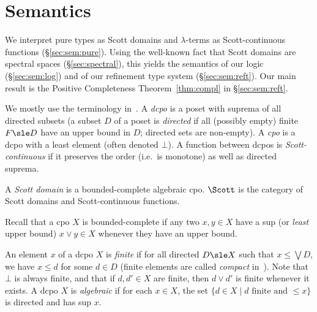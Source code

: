 \section{Semantics}
\label{sec:sem}

We interpret pure types as Scott domains and $\lambda$-terms as Scott-continuous
functions (\S\ref{sec:sem:pure}).
Using the well-known fact that Scott domains are spectral spaces
(\S\ref{sec:spectral}),
this yields the semantics of our logic (\S\ref{sec:sem:log})
and of our refinement type system (\S\ref{sec:sem:reft}).
Our main result is the Positive Completeness Theorem~\ref{thm:compl}
in \S\ref{sec:sem:reft}.


We mostly use the terminology in~\cite[\S 1]{ac98book}.
A \emph{dcpo} is a poset with suprema of all directed subsets
(a subset $D$ of a poset is \emph{directed} if all (possibly empty) finite $F \sle D$
have an upper bound in $D$; directed sets are non-empty).
A \emph{cpo} is a dcpo with a least element (often denoted $\bot$).
A function between dcpos is \emph{Scott-continuous}
if it preserves the order (i.e.\ is monotone) as well as directed suprema.

\begin{definition}
\label{def:scott}
A \emph{Scott domain} is a bounded-complete algebraic cpo.
%
$\Scott$ is the category of Scott domains and Scott-continuous functions.
\end{definition}

Recall that a cpo $X$ is bounded-complete if
any two $x,y \in X$ have a sup (or \emph{least} upper bound)
$x \vee y \in X$ whenever they have an upper bound.

An element $x$ of a dcpo $X$ is \emph{finite}
if for all directed $D \sle X$ such that $x \leq \bigvee D$,
we have $x \leq d$ for some $d \in D$
(finite elements are called \emph{compact} in~\cite{ac98book}).
Note that $\bot$ is always finite,
and that if $d,d' \in X$ are finite,
then $d \vee d'$ is finite whenever it exists.
%
A dcpo $X$ is \emph{algebraic} if for each $x \in X$,
the set $\{ d\in X \mid \text{$d$ finite and $\leq x$} \}$
is directed and has sup $x$.

